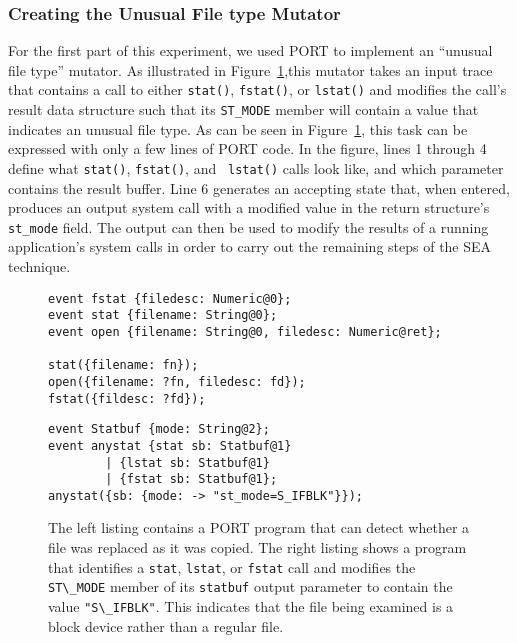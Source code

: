 \subsubsection{Creating the Unusual File type Mutator}
\label{subsub:UnusualFiletype}
For the first part of this experiment,
we used PORT to implement an ``unusual file type''
mutator.
As illustrated in Figure~\ref{lst:SEAListings},this mutator
takes an input trace
that contains a call to either {\tt stat()},
{\tt fstat()},
or {\tt lstat()}
and modifies the call's result data structure such
that its {\tt ST\_MODE} member will contain a value
that indicates an unusual file type.
As can be seen in
Figure~\ref{lst:SEAListings}, this task can be expressed with only a few lines of PORT code.  In the figure,
lines 1 through 4 define what {\tt stat()}, {\tt fstat()}, and {\tt
lstat()} calls look like, and which parameter contains the result buffer.
Line 6 generates an accepting state that, when entered, produces an output
system call with a modified value in the return structure's {\tt st\_mode}
field.  The output can then be used to modify the results of a running
application's system calls in order to carry out the remaining steps of the
SEA technique.

\begin{figure}
\centering
\begin{minipage}[t]{.5\textwidth}
\begin{lstlisting}[basicstyle=\ttfamily\scriptsize]
event fstat {filedesc: Numeric@0};
event stat {filename: String@0};
event open {filename: String@0, filedesc: Numeric@ret};

stat({filename: fn});
open({filename: ?fn, filedesc: fd});
fstat({fildesc: ?fd});
\end{lstlisting}
\end{minipage}%
\begin{minipage}[t]{.5\textwidth}
\begin{lstlisting}[basicstyle=\ttfamily\scriptsize]
event Statbuf {mode: String@2};
event anystat {stat sb: Statbuf@1}
        | {lstat sb: Statbuf@1} 
        | {fstat sb: Statbuf@1};
anystat({sb: {mode: -> "st_mode=S_IFBLK"}});
\end{lstlisting}
\end{minipage}
\caption{The left listing contains a
PORT program that can detect whether a file was replaced as it was copied.
The right listing shows a program that
identifies a \texttt{stat}, \texttt{lstat}, or \texttt{fstat} call and modifies
  the \lstinline+ST\_MODE+ member of its \lstinline+statbuf+ output parameter to contain the value
  \lstinline+"S\_IFBLK"+. This indicates that the file being examined is a block device rather than a regular file.}
\label{lst:SEAListings}
\end{figure}

